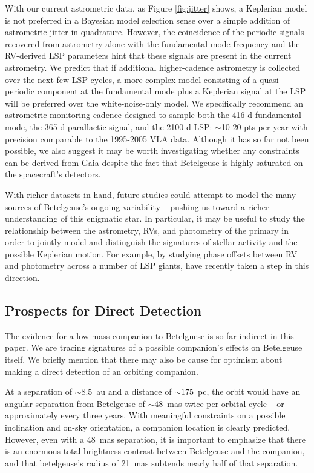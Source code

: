 \documentclass[twocolumn]{aastex631}
\begin{document}
With our current astrometric data, as Figure \ref{fig:jitter} shows, a Keplerian model is not preferred in a Bayesian model selection sense over a simple addition of astrometric jitter in quadrature. However, the coincidence of the periodic signals recovered from astrometry alone with the fundamental mode frequency and the RV-derived LSP parameters hint that these signals are present in the current astrometry. We predict that if additional higher-cadence astrometry is collected over the next few LSP cycles, a more complex model consisting of a quasi-periodic component at the fundamental mode plus a Keplerian signal at the LSP will be preferred over the white-noise-only model. We specifically recommend an astrometric monitoring cadence designed to sample both the 416 d fundamental mode, the 365 d parallactic signal, and the 2100 d LSP: $\sim$10-20 pts per year with precision comparable to  the 1995-2005 VLA data. 
Although it has so far not been possible, we also suggest it may be worth investigating whether any constraints can be derived from Gaia despite the fact that Betelgeuse is highly saturated on the spacecraft's detectors. 

With richer datasets in hand, future studies could attempt to model the many sources of Betelgeuse's ongoing variability -- pushing us toward a richer understanding of this enigmatic star. In particular, it may be useful to study the relationship between the astrometry, RVs, and photometry of the primary in order to jointly model and distinguish the signatures of stellar activity and the possible Keplerian motion. For example, by studying phase offsets between RV and photometry across a number of LSP giants, \citet{2024arXiv240809089G} have recently taken a step in this direction. 


\subsection{Prospects for Direct Detection}
The evidence for a low-mass companion to Betelguese is so far indirect in this paper. We are tracing signatures of a possible companion's effects on Betelgeuse itself. We briefly mention that there may also be cause for optimism about making a direct detection of an orbiting companion. 

At a separation of $\sim 8.5$~au and a distance of $\sim 175$~pc, the orbit would have an angular separation from Betelgeuse of $\sim 48$~mas twice per orbital cycle -- or approximately every three years. With meaningful constraints on a possible inclination and on-sky orientation, a companion location is clearly predicted. However, even with a 48~mas separation, it is important to emphasize that there is an enormous total brightness contrast between Betelgeuse and the companion, and that betelgeuse's radius of 21~mas subtends nearly half of that separation. 
\end{document}
